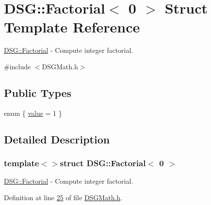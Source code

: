 \hypertarget{struct_d_s_g_1_1_factorial_3_010_01_4}{\section{D\+S\+G\+:\+:Factorial$<$ 0 $>$ Struct Template Reference}
\label{struct_d_s_g_1_1_factorial_3_010_01_4}
}


\hyperlink{struct_d_s_g_1_1_factorial}{D\+S\+G\+::\+Factorial} -\/ Compute integer factorial.  




{\ttfamily \#include $<$D\+S\+G\+Math.\+h$>$}

\subsection*{Public Types}
\begin{DoxyCompactItemize}
\item 
enum \{ \hyperlink{struct_d_s_g_1_1_factorial_3_010_01_4_a6bfe1b9c1bfc0bdeaceb03842acb1927abba93a0ae84b21f3c62dd8baa14039eb}{value} = 1
 \}
\end{DoxyCompactItemize}


\subsection{Detailed Description}
\subsubsection*{template$<$$>$struct D\+S\+G\+::\+Factorial$<$ 0 $>$}

\hyperlink{struct_d_s_g_1_1_factorial}{D\+S\+G\+::\+Factorial} -\/ Compute integer factorial. 

Definition at line \hyperlink{_d_s_g_math_8h_source_l00025}{25} of file \hyperlink{_d_s_g_math_8h_source}{D\+S\+G\+Math.\+h}.



